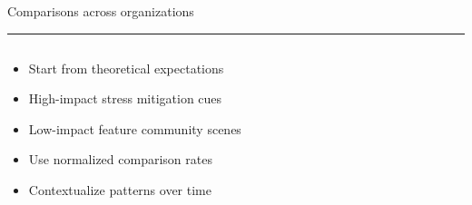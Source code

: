 \documentclass[aspectratio=169]{beamer}
\newcommand{\TitleFont}{\rmfamily}
\begin{document}
\begin{frame}[t]{}
  \vspace*{0.5cm}
  {\TitleFont\fontsize{18}{22}\selectfont\color{LUBronze}Comparisons across organizations\par}
  \vspace{0.3em}
  {\color{LUBronze}\rule{\linewidth}{0.8pt}}\par
  \vspace{0.2cm}
  \begin{columns}[t]
    \begin{column}[t]{0.45\textwidth}
      \vspace*{0pt}
      \begin{itemize}\setlength\itemsep{0.65em}
        \item Start from theoretical expectations
        \item High-impact stress mitigation cues
        \item Low-impact feature community scenes
        \item Use normalized comparison rates
        \item Contextualize patterns over time
      \end{itemize}
    \end{column}
  \end{columns}
\end{frame}
\end{document}
